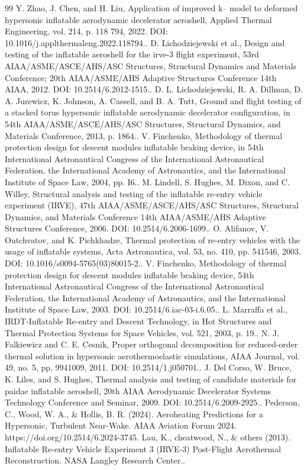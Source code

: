 \documentclass[10pt]{article}
\begin{document}
\begin{sloppypar}
\begin{thebibliography}{99}
 Y. Zhao, J. Chen, and H. Liu, Application of improved k-- model to deformed hypersonic inflatable aerodynamic decelerator aeroshell, Applied Thermal Engineering, vol. 214, p. 118 794, 2022. DOI: 10.1016/j.applthermaleng.2022.118794..
 D. Lichodziejewski et al., Design and testing of the inflatable aeroshell for the irve-3 flight experiment, 53rd AIAA/ASME/ASCE/AHS/ASC Structures, Structural Dynamics and Materials Conference; 20th AIAA/ASME/AHS Adaptive Structures Conference 14th AIAA, 2012. DOI: 10.2514/6.2012-1515..
 D. L. Lichodziejewski, R. A. Dillman, D. A. Jurewicz, K. Johnson, A. Cassell, and B. A. Tutt, Ground and flight testing of a stacked torus hypersonic inflatable aerodynamic decelerator configuration, in 54th AIAA/ASME/ASCE/AHS/ASC Structures, Structural Dynamics, and Materials Conference, 2013, p. 1864..
 V. Finchenko, Methodology of thermal protection design for descent modules inflatable braking device, in 54th International Astronautical Congress of the International Astronautical Federation, the International Academy of Astronautics, and the International Institute of Space Law, 2004, pp. I6..
 M. Lindell, S. Hughes, M. Dixon, and C. Willey, Structural analysis and testing of the inflatable re-entry vehicle experiment (IRVE), 47th AIAA/ASME/ASCE/AHS/ASC Structures, Structural Dynamics, and Materials Conference 14th AIAA/ASME/AHS Adaptive Structures Conference, 2006. DOI: 10.2514/6.2006-1699..
 O. Alifanov, V. Outchvatov, and K. Pichkhadze, Thermal protection of re-entry vehicles with the usage of inflatable systems, Acta Astronautica, vol. 53, no. 410, pp. 541546, 2003. DOI: 10.1016/s0094-5765(03)80015-2..
 V. Finchenko, Methodology of thermal protection design for descent modules inflatable braking device, 54th International Astronautical Congress of the International Astronautical Federation, the International Academy of Astronautics, and the International Institute of Space Law, 2003. DOI: 10.2514/6.iac-03-i.6.05..
 L. Marraffa et al., IRDT-Inflatable Re-entry and Descent Technology, in Hot Structures and Thermal Protection Systems for Space Vehicles, vol. 521, 2003, p. 19..
 N. J. Falkiewicz and C. E. Cesnik, Proper orthogonal decomposition for reduced-order thermal solution in hypersonic aerothermoelastic simulations, AIAA Journal, vol. 49, no. 5, pp. 9941009, 2011. DOI: 10.2514/1.j050701..
 J. Del Corso, W. Bruce, K. Liles, and S. Hughes, Thermal analysis and testing of candidate materials for paidae inflatable aeroshell, 20th AIAA Aerodynamic Decelerator Systems Technology Conference and Seminar, 2009. DOI: 10.2514/6.2009-2925..
 Pederson, C., Wood, W. A., \& Hollis, B. R. (2024). Aeroheating Predictions for a Hypersonic, Turbulent Near-Wake. AIAA Aviation Forum 2024. https://doi.org/10.2514/6.2024-3745.
 Lau, K., cheatwood, N., \& others (2013). Inflatable Re-entry Vehicle Experiment 3 (IRVE-3) Post-Flight Aerothermal Reconstruction. NASA Langley Research Center..


\end{thebibliography}
\end{sloppypar}
\end{document}
